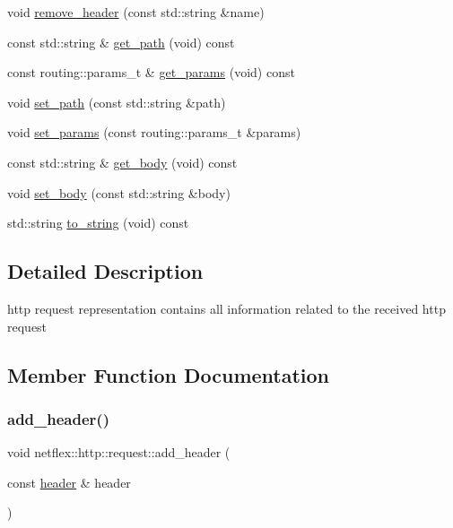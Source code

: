 \begin{DoxyCompactItemize}
\item 
void \hyperlink{classnetflex_1_1http_1_1request_ab598096641d91c5dc961e153cf47e445}{remove\+\_\+header} (const std\+::string \&name)
\item 
const std\+::string \& \hyperlink{classnetflex_1_1http_1_1request_a15483d8fc6a9af72832cb38b12457edf}{get\+\_\+path} (void) const
\item 
const routing\+::params\+\_\+t \& \hyperlink{classnetflex_1_1http_1_1request_a3c1cf98cae207060ee3f456a5bda0335}{get\+\_\+params} (void) const
\item 
void \hyperlink{classnetflex_1_1http_1_1request_a54a7cd43699b222513b38621852c1c09}{set\+\_\+path} (const std\+::string \&path)
\item 
void \hyperlink{classnetflex_1_1http_1_1request_afaf8bbb7e3b359b96991bf8b4fa6e807}{set\+\_\+params} (const routing\+::params\+\_\+t \&params)
\item 
const std\+::string \& \hyperlink{classnetflex_1_1http_1_1request_a87b3e0c5dc64ea8b4e7dda4e81254fbe}{get\+\_\+body} (void) const
\item 
void \hyperlink{classnetflex_1_1http_1_1request_aa47455728e271b519826dc060f829c48}{set\+\_\+body} (const std\+::string \&body)
\item 
std\+::string \hyperlink{classnetflex_1_1http_1_1request_a8bc2a51ee9d86cdea633adf8fd22261c}{to\+\_\+string} (void) const
\end{DoxyCompactItemize}


\subsection{Detailed Description}
http request representation contains all information related to the received http request 

\subsection{Member Function Documentation}
\mbox{\label{classnetflex_1_1http_1_1request_a18b1513d2b6a274cae832ad13dbe7760}} 
\subsubsection{\texorpdfstring{add\+\_\+header()}{add\_header()}}
{\footnotesize\ttfamily void netflex\+::http\+::request\+::add\+\_\+header (\begin{DoxyParamCaption}\item[{const \hyperlink{structnetflex_1_1http_1_1header}{header} \&}]{header }\end{DoxyParamCaption})}

